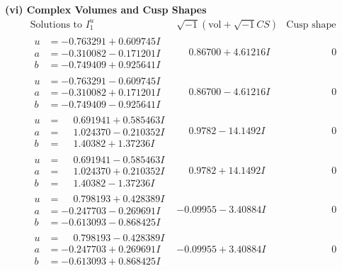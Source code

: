 \documentclass[1p]{elsarticle_modified}
\theoremstyle{definition}
\newcommand{\I}{\sqrt{-1}}
\begin{document}
\newpage\flushleft \textbf{(vi) Complex Volumes and Cusp Shapes}
$$\begin{array}{c|c|c}  
\text{Solutions to }I^u_{1}& \I (\text{vol} + \sqrt{-1}CS) & \text{Cusp shape}\\
 \hline 
\begin{aligned}
u &= -0.763291 + 0.609745 I \\
a &= -0.310082 - 0.171201 I \\
b &= -0.749409 + 0.925641 I\end{aligned}
 & \phantom{-}0.86700 + 4.61216 I & \phantom{-0.000000 } 0 \\ \hline\begin{aligned}
u &= -0.763291 - 0.609745 I \\
a &= -0.310082 + 0.171201 I \\
b &= -0.749409 - 0.925641 I\end{aligned}
 & \phantom{-}0.86700 - 4.61216 I & \phantom{-0.000000 } 0 \\ \hline\begin{aligned}
u &= \phantom{-}0.691941 + 0.585463 I \\
a &= \phantom{-}1.024370 - 0.210352 I \\
b &= \phantom{-}1.40382 + 1.37236 I\end{aligned}
 & \phantom{-}0.9782 - 14.1492 I & \phantom{-0.000000 } 0 \\ \hline\begin{aligned}
u &= \phantom{-}0.691941 - 0.585463 I \\
a &= \phantom{-}1.024370 + 0.210352 I \\
b &= \phantom{-}1.40382 - 1.37236 I\end{aligned}
 & \phantom{-}0.9782 + 14.1492 I & \phantom{-0.000000 } 0 \\ \hline\begin{aligned}
u &= \phantom{-}0.798193 + 0.428389 I \\
a &= -0.247703 - 0.269691 I \\
b &= -0.613093 - 0.868425 I\end{aligned}
 & -0.09955 - 3.40884 I & \phantom{-0.000000 } 0 \\ \hline\begin{aligned}
u &= \phantom{-}0.798193 - 0.428389 I \\
a &= -0.247703 + 0.269691 I \\
b &= -0.613093 + 0.868425 I\end{aligned}
 & -0.09955 + 3.40884 I & \phantom{-0.000000 } 0 \\ \hline\begin{aligned}

\end{aligned}
\end{array}$$
\end{document}
